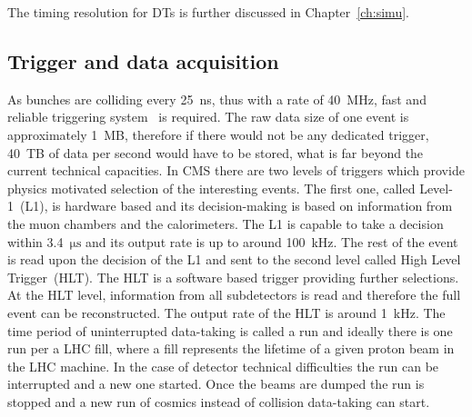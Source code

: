 \begin{description}
The timing resolution for DTs is further discussed in Chapter~\ref{ch:simu}.


\end{description}

\subsection{Trigger and data acquisition}

As bunches are colliding every 25~ns, thus with a rate of 40~MHz, fast and reliable triggering system~\cite{Khachatryan:2016bia} is required. The raw data size of one event is approximately 1~MB, therefore if there would not be any dedicated trigger, 40~TB of data per second would have to be stored, what is far beyond the current technical capacities. In CMS there are two levels of triggers which provide physics motivated selection of the interesting events. The first one, called Level-1~(L1), is hardware based and its decision-making is based on information from the muon chambers and the calorimeters. The L1 is capable to take a decision within 3.4~$\mathrm{\mu s}$ and its output rate is up to around 100~kHz. The rest of the event is read upon the decision of the L1 and sent to the second level called High Level Trigger~(HLT). The HLT is a software based trigger providing further selections. At the HLT level, information from all subdetectors is read and therefore the full event can be reconstructed. The output rate of the HLT is around 1~kHz. The time period of uninterrupted data-taking is called a run and ideally there is one run per a LHC fill, where a fill represents the lifetime of a given proton beam in the LHC machine. In the case of  detector technical difficulties the run can be interrupted and a new one started. Once the beams are dumped the run is stopped and a new run of cosmics instead of collision data-taking can start.

